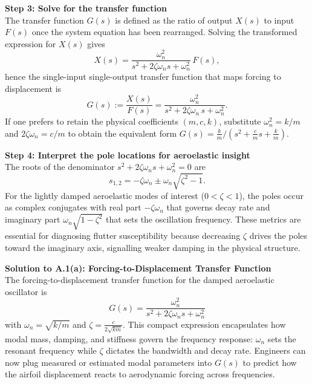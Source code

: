 \documentclass[12pt]{article}
\begin{document}
\begin{stepbox}
\textbf{Step 3: Solve for the transfer function}\\[0.5em]
The transfer function $G(s)$ is defined as the ratio of output $X(s)$ to input $F(s)$ once the system equation has been rearranged.  Solving the transformed expression for $X(s)$ gives
\[
X(s) = \frac{\omega_n^2}{s^2 + 2\zeta\omega_n s + \omega_n^2}\,F(s),
\]
hence the single-input single-output transfer function that maps forcing to displacement is
\[
G(s) := \frac{X(s)}{F(s)} = \frac{\omega_n^2}{s^2 + 2\zeta\omega_n\,s + \omega_n^2}.
\]
If one prefers to retain the physical coefficients $(m,c,k)$, substitute $\omega_n^2 = k/m$ and $2\zeta\omega_n = c/m$ to obtain the equivalent form $G(s) = \tfrac{k}{m}\big/(s^2 + \tfrac{c}{m}s + \tfrac{k}{m})$.
\end{stepbox}

\begin{stepbox}
\textbf{Step 4: Interpret the pole locations for aeroelastic insight}\\[0.5em]
The roots of the denominator $s^2 + 2\zeta\omega_n s + \omega_n^2 = 0$ are
\[
s_{1,2} = -\zeta\omega_n \pm \omega_n \sqrt{\zeta^2-1}.
\]
For the lightly damped aeroelastic modes of interest ($0 < \zeta < 1$), the poles occur as complex conjugates with real part $-\zeta\omega_n$ that governs decay rate and imaginary part $\omega_n\sqrt{1-\zeta^2}$ that sets the oscillation frequency.  These metrics are essential for diagnosing flutter susceptibility because decreasing $\zeta$ drives the poles toward the imaginary axis, signalling weaker damping in the physical structure.
\end{stepbox}

\begin{resultsbox}
\textbf{Solution to A.1(a): Forcing-to-Displacement Transfer Function}\\[0.5em]
The forcing-to-displacement transfer function for the damped aeroelastic oscillator is
\[
G(s) = \frac{\omega_n^2}{s^2 + 2\zeta\omega_n s + \omega_n^2}
\]
with $\omega_n = \sqrt{k/m}$ and $\zeta = \tfrac{c}{2\sqrt{km}}$.  This compact expression encapsulates how modal mass, damping, and stiffness govern the frequency response: $\omega_n$ sets the resonant frequency while $\zeta$ dictates the bandwidth and decay rate.  Engineers can now plug measured or estimated modal parameters into $G(s)$ to predict how the airfoil displacement reacts to aerodynamic forcing across frequencies.
\end{resultsbox}
\end{document}
